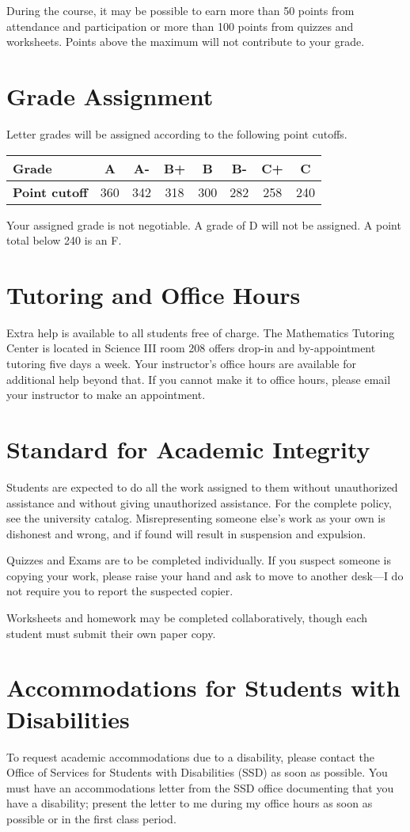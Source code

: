 \documentclass[10pt, letterpaper]{letter}
\begin{document}
During the course, it may be possible to earn more than 50 points from
attendance and participation or more than 100 points from quizzes and
worksheets. Points above the maximum will not contribute to your grade.

\section{Grade Assignment}

Letter grades will be assigned according to the following point cutoffs.

\begin{tabular}{l|c|c|c|c|c|c|c}
    \textbf{Grade}        & A   & A-  & B+  & B   & B-  & C+  & C   \\
    \hline
    \textbf{Point cutoff} & 360 & 342 & 318 & 300 & 282 & 258 & 240 \\
\end{tabular}

Your assigned grade is not negotiable. A grade of D will not be
assigned. A point total below 240 is an F.

\section{Tutoring and Office Hours}

Extra help is available to all students free of charge. The Mathematics
Tutoring Center is located in Science III room 208 offers drop-in and
by-appointment tutoring five days a week. Your instructor's office hours
are available for additional help beyond that. If you cannot make it to
office hours, please email your instructor to make an appointment.

\section{Standard for Academic Integrity}

Students are expected to do all the work assigned to them without
unauthorized assistance and without giving unauthorized assistance. For
the complete policy, see the university catalog. Misrepresenting
someone else's work as your own is dishonest and wrong, and if found
will result in suspension and expulsion.

Quizzes and Exams are to be completed individually. If you suspect
someone is copying your work, please raise your hand and ask to move to
another desk---I do not require you to report the suspected copier.

Worksheets and homework may be completed collaboratively, though each
student must submit their own paper copy.

\section{Accommodations for Students with Disabilities}

To request academic accommodations due to a disability, please contact
the Office of Services for Students with Disabilities (SSD) as soon as
possible. You must have an accommodations letter from the SSD office
documenting that you have a disability; present the letter to me during
my office hours as soon as possible or in the first class period.
\end{document}
